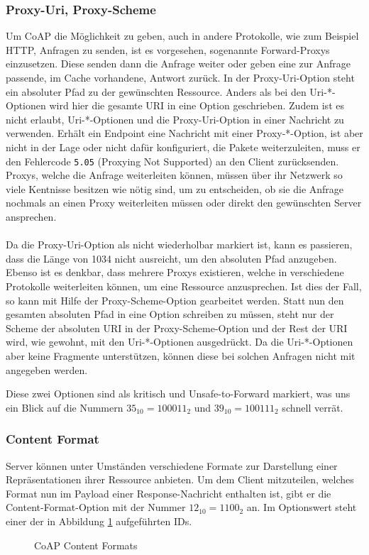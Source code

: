 \subsubsection{Proxy-Uri, Proxy-Scheme}
\label{option:proxyoptions}
Um CoAP die Möglichkeit zu geben, auch in andere Protokolle, wie zum Beispiel
HTTP, Anfragen zu senden, ist es vorgesehen, sogenannte Forward-Proxys
einzusetzen. Diese senden dann die Anfrage weiter oder geben eine zur
Anfrage passende, im Cache vorhandene, Antwort zurück.
In der Proxy-Uri-Option steht ein absoluter Pfad zu der gewünschten Ressource.
Anders als bei den Uri-*-Optionen wird hier die gesamte URI in eine Option
geschrieben. Zudem ist es nicht erlaubt, Uri-*-Optionen und die Proxy-Uri-Option
in einer Nachricht zu verwenden. Erhält ein Endpoint eine Nachricht mit einer
Proxy-*-Option, ist aber nicht in der Lage oder nicht dafür konfiguriert, die
Pakete weiterzuleiten, muss er den Fehlercode \verb!5.05! (Proxying Not Supported) an den
Client zurücksenden. Proxys, welche die Anfrage weiterleiten können, müssen
über ihr Netzwerk so viele Kentnisse besitzen wie nötig sind, um zu entscheiden, ob sie die
Anfrage nochmals an einen Proxy weiterleiten müssen oder direkt den gewünschten Server
ansprechen.\\\\
Da die Proxy-Uri-Option als nicht wiederholbar markiert ist, kann es passieren,
dass die Länge von 1034 nicht ausreicht, um den absoluten Pfad anzugeben. Ebenso
ist es denkbar, dass mehrere Proxys existieren, welche in verschiedene
Protokolle weiterleiten können, um eine Ressource anzusprechen. Ist dies der
Fall, so kann mit Hilfe der Proxy-Scheme-Option gearbeitet werden. Statt nun
den gesamten absoluten Pfad in eine Option schreiben zu müssen, steht nur der
Scheme der absoluten URI in der Proxy-Scheme-Option und der Rest der URI
wird, wie gewohnt, mit den Uri-*-Optionen ausgedrückt.
Da die Uri-*-Optionen aber keine Fragmente unterstützen, können diese bei
solchen Anfragen nicht mit angegeben werden.

Diese zwei Optionen sind als kritisch und Unsafe-to-Forward markiert,
was uns ein Blick auf die Nummern $35_{10}=100011_{2}$ und $39_{10}=100111_{2}$
schnell verrät.

\subsubsection{Content Format}
\label{option:contentformat}
Server können unter Umständen verschiedene Formate zur Darstellung einer
Repräsentationen ihrer Ressource anbieten.
Um dem Client mitzuteilen, welches Format nun im Payload einer Response-Nachricht enthalten ist,
gibt er die Content-Format-Option mit der Nummer $12_{10}=1100_{2}$ an.
Im Optionswert steht einer der in Abbildung \ref{table:contentformat}
aufgeführten IDs.
\begin{figure}[htbp]
   \centering
   \begin{minipage}{.94\textwidth}
   
   \caption{CoAP Content Formats}
   \end{minipage}
   \label{table:contentformat}
\end{figure}
